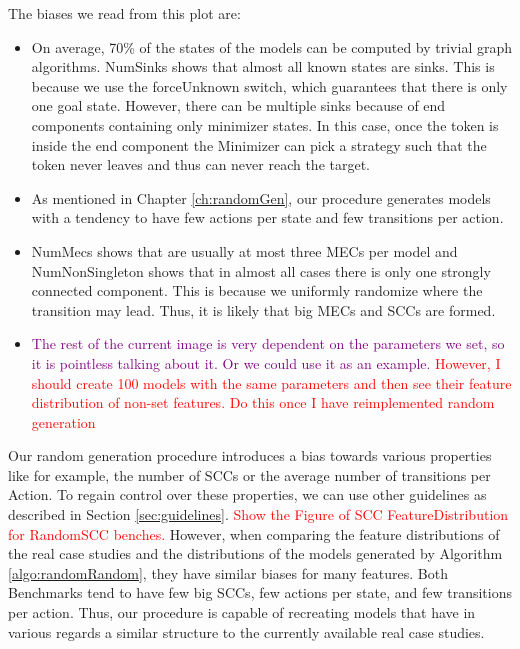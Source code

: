 The biases we read from this plot are:
\begin{itemize}
    \item On average, 70\% of the states of the models can be computed by trivial graph algorithms. NumSinks shows that almost all known states are sinks.
            This is because we use the forceUnknown switch, which guarantees that there is only one goal state. 
            However, there can be multiple sinks because of end components containing only minimizer states. 
            In this case, once the token is inside the end component the Minimizer can pick a strategy such that the token never leaves and thus can never reach the target.
    \item As mentioned in Chapter \ref{ch:randomGen}, our procedure generates models with a tendency to have few actions per state and few transitions per action.
    \item NumMecs shows that are usually at most three MECs per model
    and NumNonSingleton shows that in almost all cases there is only one strongly connected component.
        This is because we uniformly randomize where the transition may lead. Thus, it is likely that big MECs and SCCs are formed. 
    \item \textcolor{purple}{The rest of the current image is very dependent on the parameters we set, so it is pointless talking about it.
          Or we could use it as an example.}
          \textcolor{red}{However, I should create 100 models with the same parameters and then see their feature distribution of non-set features. Do this once I have reimplemented random generation}
\end{itemize}

Our random generation procedure introduces a bias towards various properties like for example, the number of SCCs or the average number of transitions per Action. 
To regain control over these properties, we can use other guidelines as described in Section \ref{sec:guidelines}.
\textcolor{red}{Show the Figure of SCC FeatureDistribution for RandomSCC benches.}
However, when comparing the feature distributions of the real case studies and the distributions of the models generated by Algorithm \ref{algo:randomRandom},
they have similar biases for many features. Both Benchmarks tend to have few big SCCs, few actions per state, and few transitions per action.
Thus, our procedure is capable of recreating models that have in various regards a similar structure to the currently available real case studies. 

